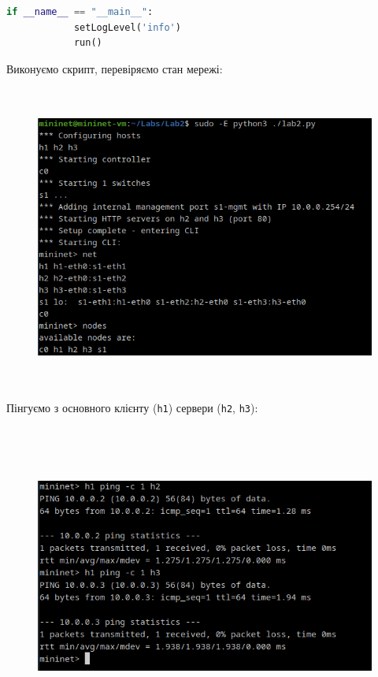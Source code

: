 \documentclass[14pt, a4paper]{extreport}
\begin{document}
	\begin{lstlisting}[language=Python]
		if __name__ == "__main__":
			setLogLevel('info')
			run()\end{lstlisting}
		
	Виконуємо скрипт, перевіряємо стан мережі:
	
	\begin{figure}[H]
		\centering
		\includegraphics[height=10cm]{02} 
	\end{figure}
	
	Пінгуємо з основного клієнту (\texttt{h1}) сервери (\texttt{h2}, \texttt{h3}):
	
	\begin{figure}[H]
		\centering
		\includegraphics[height=10cm]{03} 
	\end{figure}
	
\end{document}
